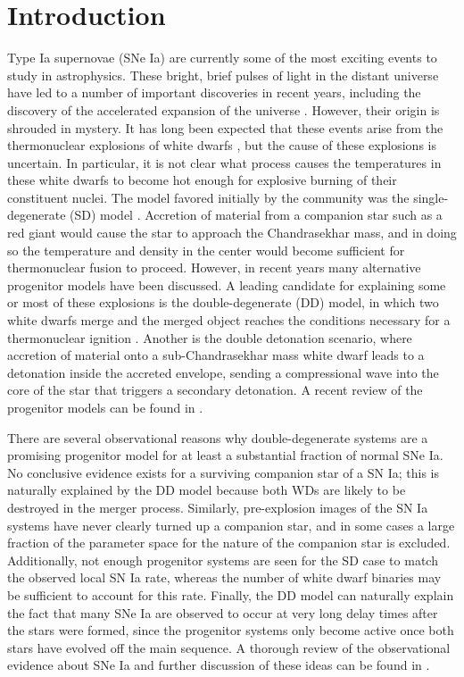 \documentclass[iop]{../emulateapj}
\begin{document}
\section{Introduction}

Type Ia supernovae (SNe Ia) are currently some of the most exciting
events to study in astrophysics. These bright, brief pulses of light
in the distant universe have led to a number of important discoveries
in recent years, including the discovery of the accelerated expansion
of the universe \citep{perlmutter1999,riess1998}. However, their
origin is shrouded in mystery. It has long been expected that these
events arise from the thermonuclear explosions of white dwarfs
\citep{hoyle_fowler:1960}, but the cause of these explosions is
uncertain. In particular, it is not clear what process causes the
temperatures in these white dwarfs to become hot enough for explosive
burning of their constituent nuclei. The model favored initially by the
community was the single-degenerate (SD) model
\citep{whelan_iben:1973}. Accretion of material from a companion star
such as a red giant would cause the star to approach the Chandrasekhar
mass, and in doing so the temperature and density in the center would
become sufficient for thermonuclear fusion to proceed. However, in
recent years many alternative progenitor models have been discussed. A
leading candidate for explaining some or most of these explosions is
the double-degenerate (DD) model, in which two white dwarfs merge and
the merged object reaches the conditions necessary for a thermonuclear
ignition \citep{ibentutukov:1984,webbink:1984}. Another is the double
detonation scenario, where accretion of material onto a
sub-Chandrasekhar mass white dwarf leads to a detonation inside the
accreted envelope, sending a compressional wave into the
core of the star that triggers a secondary detonation. A recent
review of the progenitor models can be found in
\citet{hillebrandt:2013}.

There are several observational reasons why double-degenerate systems
are a promising progenitor model for at least a substantial fraction
of normal SNe Ia. No conclusive evidence exists for a surviving
companion star of a SN Ia; this is naturally explained by the DD model
because both WDs are likely to be destroyed in the merger
process. Similarly, pre-explosion images of the SN Ia systems have
never clearly turned up a companion star, and in some cases a large
fraction of the parameter space for the nature of the companion star
is excluded. Additionally, not enough progenitor systems are seen for
the SD case to match the observed local SN Ia rate, whereas the number
of white dwarf binaries may be sufficient to account for this
rate. Finally, the DD model can naturally explain the fact that many
SNe Ia are observed to occur at very long delay times after the stars
were formed, since the progenitor systems only become active once both
stars have evolved off the main sequence. A thorough review of the
observational evidence about SNe Ia and further discussion of these
ideas can be found in \cite{maoz:2014}.
\end{document}

